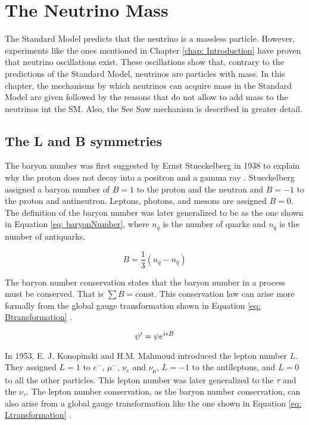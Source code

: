 \chapter{The Neutrino Mass}\label{chapter: neutrinoMass}

The Standard Model predicts that the neutrino is a massless particle. However, experiments like the ones mentioned in Chapter \ref{chap: Introduction} have proven that neutrino oscillations exist. These oscillations show that, contrary to the predictions of the Standard Model, neutrinos are particles with mass. In this chapter, the mechanisms by which neutrinos can acquire mass in the Standard Model are given followed by the reasons that do not allow to add mass to the neutrinos int the SM. Also, the See Saw mechanism is described in greater detail. 

\section{The L and B symmetries} 

The baryon number was first suggested by Ernst Stueckelberg in 1938 to explain why the proton does not decay into a positron and a gamma ray \cite{b-l symmetry}. Stueckelberg assigned a baryon number of $B = 1$ to the proton and the neutron and $B = -1$ to the proton and antineutron. Leptons, photons, and mesons are assigned $B = 0$. The definition of the baryon number was later generalized to be as the one shown in Equation \ref{eq: baryonNumber}, where $n_{q}$ is the number of quarks and $n_{\bar{q}}$ is the number of antiquarks.


\begin{equation}\label{eq: baryonNumber}
B = \frac{1}{3}\left(n_{q} - n_{\bar{q}}\right)
\end{equation}

The baryon number conservation states that the baryon number in a process must be conserved. That is $\sum B = \text{const}$. This conservation law can arise more formally from the global gauge transformation shown in Equation \ref{eq: Btransformation} \cite{b-l symmetry}.

\begin{equation}\label{eq: Btransformation}
\psi^{\prime} = \psi e^{{i\mkern1mu} \epsilon B} 
\end{equation}

In 1953, E. J. Konopinski and H.M. Mahmoud introduced the lepton number $L$. They assigned $L = 1$ to $e^{-}$, $\mu^{-}$, $\nu_{e}$ and $\nu_{\mu}$, $L = -1$ to the antileptons, and $L = 0$ to all the other particles. This lepton number was later generalized to the $\tau$ and the $\nu_{\tau}$. The lepton number conservation, as the baryon number conservation, can also arise from a global gauge transformation like the one shown in Equation \ref{eq: Ltransformation} \cite{b-l symmetry}.

